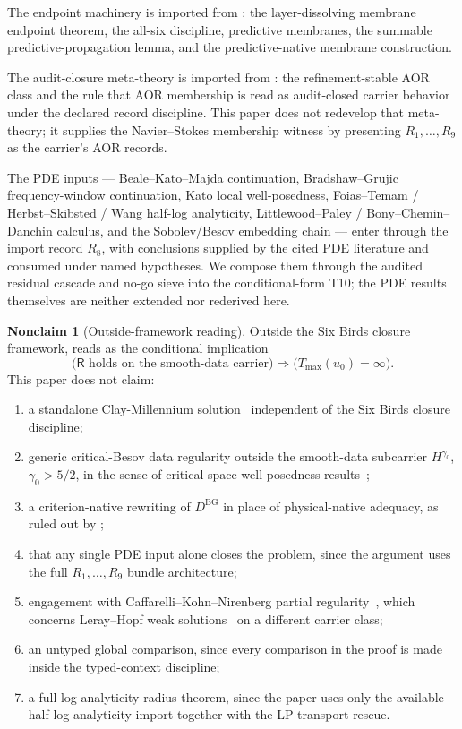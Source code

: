 \documentclass[11pt]{article}
\newcommand{\DBG}{D^{\mathrm{BG}}}
\newcommand{\Tmax}{T_{\max}}
\theoremstyle{definition}
\newtheorem{nonclaim}[theorem]{Nonclaim}
\begin{document}
The endpoint machinery is imported from
\citet{Tsiokos2026NeedleKiller}: the layer-dissolving membrane
endpoint theorem, the all-six discipline, predictive membranes, the
summable predictive-propagation lemma, and the predictive-native
membrane construction.

The audit-closure meta-theory is imported from
\citet{Tsiokos2026AOR}: the refinement-stable AOR class and the rule
that AOR membership is read as audit-closed carrier behavior under the
declared record discipline.  This paper does not redevelop that
meta-theory; it supplies the Navier--Stokes membership witness by
presenting \(R_1,\ldots,R_9\) as the carrier's AOR records.

The PDE inputs --- Beale--Kato--Majda continuation,
Bradshaw--Grujic frequency-window continuation, Kato local
well-posedness, Foias--Temam / Herbst--Skibsted / Wang half-log
analyticity, Littlewood--Paley / Bony--Chemin--Danchin calculus,
and the Sobolev/Besov embedding chain --- enter through the import
record \(R_8\), with conclusions supplied by the cited PDE literature
and consumed under named hypotheses.  We compose them through the
audited residual cascade and no-go sieve into the
conditional-form T10; the PDE results themselves are neither
extended nor rederived here.

\begin{nonclaim}[Outside-framework reading]\label{nonclaim:ns:outside-framework}
Outside the Six Birds closure framework,  reads as the conditional implication
\[
  \bigl(\mathsf R\text{ holds on the smooth-data carrier}\bigr)
  \Longrightarrow
  \bigl(\Tmax(u_0)=\infty\bigr).
\]
This paper does not claim:
\begin{enumerate}
\item a standalone Clay-Millennium
solution~\citep{Fefferman2000NavierStokes} independent of the Six
Birds closure discipline;
\item generic critical-Besov data regularity outside the smooth-data
subcarrier \(H^{\gamma_0}\), \(\gamma_0>5/2\), in the sense of
critical-space well-posedness
results~\citep{KochTataru2001,Cannone1995,LemarieRieusset2023};
\item a criterion-native rewriting of \(\DBG\) in place of
physical-native adequacy, as ruled out by
;
\item that any single PDE input alone closes the problem, since the
argument uses the full \(R_1,\ldots,R_9\) bundle architecture;
\item engagement with Caffarelli--Kohn--Nirenberg partial
regularity~\citep{CaffarelliKohnNirenberg1982}, which concerns
Leray--Hopf weak solutions~\citep{Leray1934,Hopf1951} on a different
carrier class;
\item an untyped global comparison, since every comparison in the proof
is made inside the typed-context discipline;
\item a full-log analyticity radius theorem, since the paper uses only
the available half-log analyticity import together with the
LP-transport rescue.
\end{enumerate}
\end{nonclaim}
\end{document}
